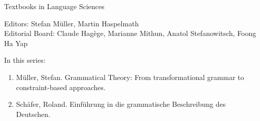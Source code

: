 {\large Textbooks in Language Sciences}

\bigskip

Editors: Stefan Müller, Martin Haspelmath  \\
Editorial Board: Claude Hagège, Marianne Mithun, Anatol Stefanowitsch, Foong Ha Yap

\bigskip

In this series:

\begin{enumerate}
\item Müller, Stefan. Grammatical Theory: From transformational grammar to constraint-based approaches.
\item Schäfer, Roland. Einführung in die grammatische Beschreibung des Deutschen.
\end{enumerate}